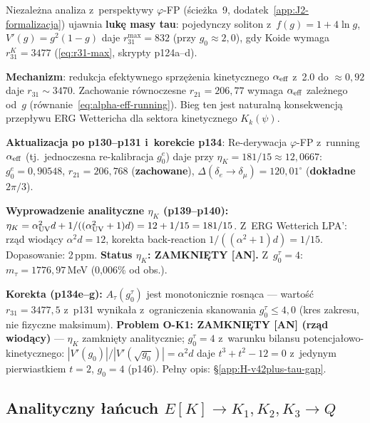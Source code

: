 \begin{remark}%
\label{rem:tau-gap-v42plus}
Niezale\.zna analiza z~perspektywy $\varphi$-FP
(\'scie\.zka~9, dodatek~\ref{app:J2-formalizacja}) ujawnia
\textbf{luk\k{e} masy tau}: pojedynczy soliton
z~$f(g)=1+4\ln g$, $V'(g)=g^2(1-g)$ daje
$r_{31}^{\max} = 832$ (przy $g_0\approx 2{,}0$),
gdy Koide wymaga $r_{31}^K = 3477$
(\ref{eq:r31-max}, skrypty p124a--d).

\textbf{Mechanizm}: redukcja efektywnego sprz\k{e}\.zenia
kinetycznego $\alpha_{\rm eff}$ z~2.0 do $\approx 0{,}92$
daje $r_{31} \sim 3470$. Zachowanie r\'ownoczesne
$r_{21} = 206{,}77$ wymaga $\alpha_{\rm eff}$
zale\.znego od~$g$ (r\'ownanie~\eqref{eq:alpha-eff-running}).
Bieg ten jest naturaln\k{a} konsekwencj\k{a}
przep\l{}ywu ERG Wettericha dla sektora kinetycznego $K_k(\psi)$.

\textbf{Aktualizacja po p130--p131 i~korekcie p134}:
Re-derywacja $\varphi$-FP z~running $\alpha_{\rm eff}$
(tj.~jednoczesna re-kalibracja $g_0^e$) daje przy
$\eta_K = 181/15 \approx 12{,}0667$:
$g_0^e = 0{,}90548$,
$r_{21} = 206{,}768$ (\textbf{zachowane}),
$\Delta(\delta_e \to \delta_\mu) = 120{,}01^\circ$
(\textbf{dok\l{}adne} $2\pi/3$).

\textbf{Wyprowadzenie analityczne $\eta_K$ (p139--p140):}
$\eta_K = \alpha_{\rm UV}^2 d + 1/((\alpha_{\rm UV}^2+1)d)
= 12 + 1/15 = 181/15$.
Z~ERG Wetterich LPA': rz\k{a}d wiod\k{a}cy $\alpha^2 d = 12$,
korekta back-reaction $1/((\alpha^2+1)d) = 1/15$.
Dopasowanie: 2\,ppm. \textbf{Status $\eta_K$: ZAMKNI\k{E}TY [AN].}
Z~$g_0^\tau = 4$: $m_\tau = 1776{,}97$\,MeV (0{,}006\% od obs.).

\textbf{Korekta (p134e--g):} $A_\tau(g_0^\tau)$ jest monotonicznie
rosn\k{a}ca --- warto\'s\'c $r_{31}=3477{,}5$ z~p131 wynika\l{}a
z~ograniczenia skanowania $g_0^\tau \le 4{,}0$ (kres zakresu,
nie fizyczne maksimum).
\textbf{Problem O-K1: ZAMKNI\k{E}TY [AN] (rz\k{a}d wiod\k{a}cy)} ---
$\eta_K$ zamkni\k{e}ty analitycznie; $g_0^\tau = 4$ z~warunku bilansu
potencja\l{}owo-kinetycznego: $|V'(g_0)|/|V'(\sqrt{g_0})| = \alpha^2 d$
daje $t^3+t^2-12=0$ z~jedynym pierwiastkiem $t=2$, $g_0=4$ (p146).
Pe\l{}ny opis: \S\ref{app:H-v42plus-tau-gap}.
\end{remark}

\subsection{Analityczny \l{}a\'ncuch $E[K]\to K_1,K_2,K_3\to Q$}%
\label{app:F-analytic-chain}

